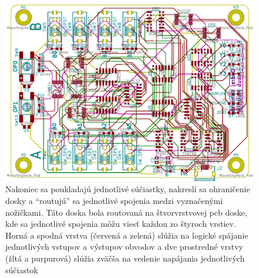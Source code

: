 \documentclass{article}
\begin{document}
    \begin{figure}[h!]
        \centering
        \includegraphics[width=.9\linewidth]{pcb.pdf}
        \caption{Nakoniec sa poukladajú jednotlivé súčiastky, nakreslí sa ohraničenie dosky a ``routujú'' sa jednotlivé spojenia medzi vyznačenými nožičkami. Táto doska bola routovaná na štvorvrstvovej pcb doske, kde sa jednotlivé spojenia môžu viesť každou zo štyroch vrstiev. Horná a spodná vrstva (červená a zelená) slúžia na logické spájanie jednotlivých vstupov a výstupov obvodov a dve prostredné vrstvy (žltá a purpurová) slúžia zväčša na vedenie napájania jednotlivých súčiastok}
    \end{figure}
\end{document}
